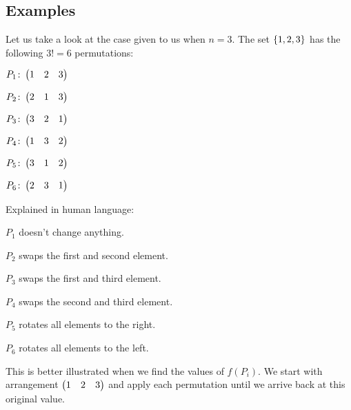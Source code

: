 \subsection{Examples}

Let us take a look at the case given to us when \( n = 3 \). The set \( \left\{ 1, 2, 3 \right\} \) has the following \( 3! = 6 \) permutations:

\begin{center}
\begin{multicols}{3}
    \( P_1\colon \begin{pmatrix} 1 & 2 & 3 \end{pmatrix} \)

    \( P_2\colon \begin{pmatrix} 2 & 1 & 3 \end{pmatrix} \)

    \( P_3\colon \begin{pmatrix} 3 & 2 & 1 \end{pmatrix} \)

    \( P_4\colon \begin{pmatrix} 1 & 3 & 2 \end{pmatrix} \)

    \( P_5\colon \begin{pmatrix} 3 & 1 & 2 \end{pmatrix} \)

    \( P_6\colon \begin{pmatrix} 2 & 3 & 1 \end{pmatrix} \)
\end{multicols}
\end{center}

Explained in human language:

\begin{itemize}
    \begin{multicols}{2}
    \item \( P_1 \) doesn't change anything.
    \item \( P_2 \) swaps the first and second element.
    \item \( P_3 \) swaps the first and third element.
    \item \( P_4 \) swaps the second and third element.
    \item \( P_5 \) rotates all elements to the right.
    \item \( P_6 \) rotates all elements to the left.
    \end{multicols}
\end{itemize}

This is better illustrated when we find the values of \( f \left( P_i \right) \). We start with arrangement \( \begin{pmatrix} 1 & 2 & 3 \end{pmatrix} \) and apply each permutation until we arrive back at this original value.

